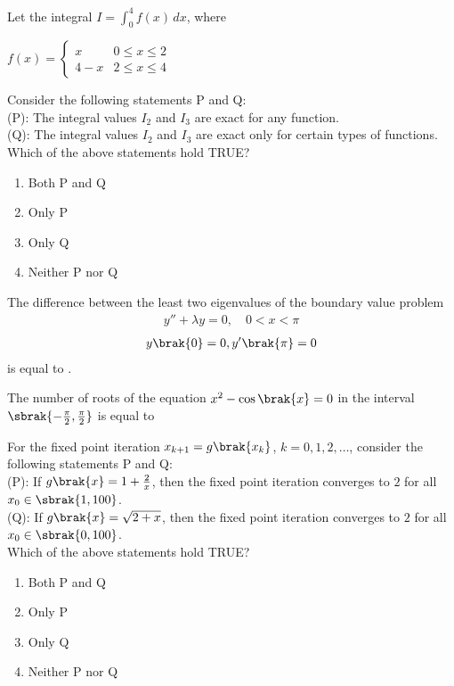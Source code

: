 \item Let the integral $I = \int_0^4 f(x) \, dx$, where 

$f(x) = 
\begin{cases} 
x & 0 \leq x \leq 2 \\ 
4 - x & 2 \leq x \leq 4 
\end{cases}$

Consider the following statements P and Q:\\
(P): The integral values \( I_2 \) and \( I_3 \) are exact for any function.\\
(Q): The integral values \( I_2 \) and \( I_3 \) are exact only for certain types of functions.\\

Which of the above statements hold TRUE?
\begin{multicols}{2}
\begin{enumerate}
    \item Both P and Q
    \item Only P
    \item Only Q
    \item Neither P nor Q
\end{enumerate}
\end{multicols}

\item The difference between the least two eigenvalues of the boundary value problem
\begin{align*}
y'' + \lambda y = 0, \quad 0 < x < \pi
\end{align*}
\begin{align*}
y\brak{0} = 0,  y'\brak{\pi} = 0
\end{align*}
is equal to \underline{\hspace{2cm}}.

\item The number of roots of the equation $x^2 - \cos\brak{x} = 0$ in the interval $\sbrak{-\frac{\pi}{2}, \frac{\pi}{2} }$ is equal to \underline{\hspace{2cm}}\\

\item For the fixed point iteration $x_{k+1} = g\brak{x_k}$, $k = 0, 1, 2, \dots$, consider the following statements P and Q:\\

(P): If $g\brak{x} = 1 + \frac{2}{x}$, then the fixed point iteration converges to $2$ for all $x_0 \in \sbrak{1, 100}$.\\

(Q): If $g\brak{x} = \sqrt{2 + x}$, then the fixed point iteration converges to $2$ for all $x_0 \in \sbrak{0, 100}$.\\

Which of the above statements hold TRUE?
\begin{multicols}{2}
\begin{enumerate}
    \item Both P and Q
    \item Only P
    \item Only Q
    \item Neither P nor Q
\end{enumerate}
\end{multicols}


